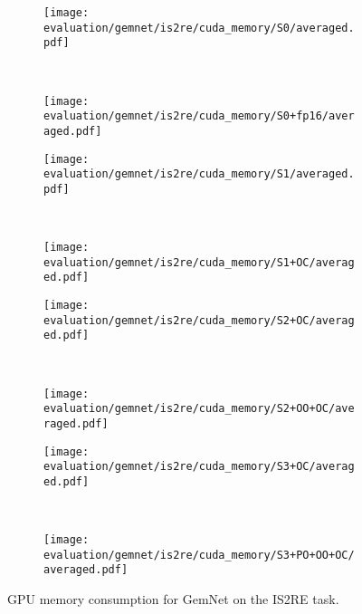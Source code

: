 \begin{figure}[H]

    \centering

    \begin{subfigure}[t]{0.49\textwidth}
        \centering
        \texttt{[image: evaluation/gemnet/is2re/cuda\_memory/S0/averaged.pdf]}
    \end{subfigure}%
    ~
    \begin{subfigure}[t]{0.49\textwidth}
        \centering
        \texttt{[image: evaluation/gemnet/is2re/cuda\_memory/S0+fp16/averaged.pdf]}
    \end{subfigure}

    \begin{subfigure}[t]{0.49\textwidth}
        \centering
        \texttt{[image: evaluation/gemnet/is2re/cuda\_memory/S1/averaged.pdf]}
    \end{subfigure}%
    ~
    \begin{subfigure}[t]{0.49\textwidth}
        \centering
        \texttt{[image: evaluation/gemnet/is2re/cuda\_memory/S1+OC/averaged.pdf]}
    \end{subfigure}

    \begin{subfigure}[t]{0.49\textwidth}
        \centering
        \texttt{[image: evaluation/gemnet/is2re/cuda\_memory/S2+OC/averaged.pdf]}
    \end{subfigure}%
    ~
    \begin{subfigure}[t]{0.49\textwidth}
        \centering
        \texttt{[image: evaluation/gemnet/is2re/cuda\_memory/S2+OO+OC/averaged.pdf]}
    \end{subfigure}

    \begin{subfigure}[t]{0.49\textwidth}
        \centering
        \texttt{[image: evaluation/gemnet/is2re/cuda\_memory/S3+OC/averaged.pdf]}
    \end{subfigure}%
    ~
    \begin{subfigure}[t]{0.49\textwidth}
        \centering
        \texttt{[image: evaluation/gemnet/is2re/cuda\_memory/S3+PO+OO+OC/averaged.pdf]}
    \end{subfigure}

    \caption{GPU memory consumption for GemNet on the IS2RE task.}
    
\end{figure}